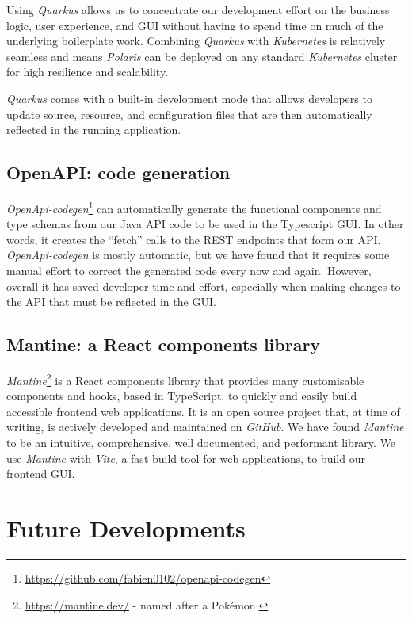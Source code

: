 \documentclass[11pt,twoside]{article}
\begin{document}
Using \emph{Quarkus} allows us to concentrate our development effort on the business logic, user experience, and GUI
without having to spend time on much of the underlying boilerplate work.
Combining \emph{Quarkus} with \emph{Kubernetes} is relatively seamless and means \emph{Polaris} can be deployed
on any standard \emph{Kubernetes} cluster for high resilience and scalability.

\emph{Quarkus} comes with a built-in development mode that allows developers to update source, resource, and
configuration files that are then automatically reflected in the running application.

\subsection{OpenAPI: code generation}\label{subsec:openapi-code-generation}

\emph{OpenApi-codegen}\footnote{\url{https://github.com/fabien0102/openapi-codegen}} can automatically generate the functional components and type schemas from
our Java API code to be used in the Typescript GUI\@.
In other words, it creates the ``fetch'' calls to the REST endpoints that form our API\@.
\emph{OpenApi-codegen} is mostly automatic, but we have found that it requires some manual effort to correct
the generated code every now and again.
However, overall it has saved developer time and effort, especially when making changes to the API that must be
reflected in the GUI\@.

\subsection{Mantine: a React components library}\label{subsec:mantine:-a-react-components-library}

\emph{Mantine}\footnote{\url{https://mantine.dev/} - named after a Pok\'emon.} is a React components library that
provides many customisable components and hooks, based in TypeScript, to quickly and easily build accessible
frontend web applications.
It is an open source project that, at time of writing, is actively developed and maintained on \emph{GitHub}.
We have found \emph{Mantine} to be an intuitive, comprehensive, well documented, and performant library.
We use \emph{Mantine} with \emph{Vite}, a fast build tool for web applications, to build our frontend GUI\@.

\section{Future Developments}\label{sec:future-developments}
\end{document}
